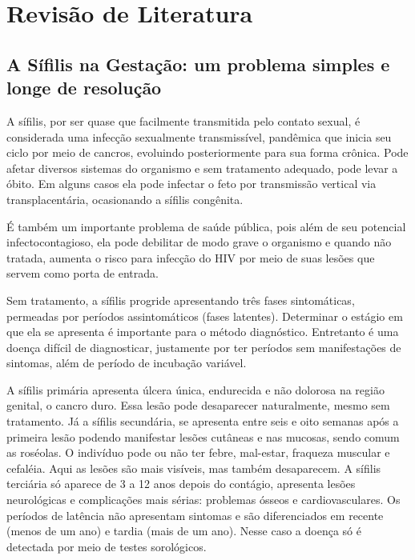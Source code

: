\chapter{Revisão de Literatura}
\label{sec:revisao}

\section{A Sífilis na Gestação: um problema simples e longe de resolução}
A sífilis, por ser quase que facilmente transmitida pelo contato sexual, é considerada uma infecção sexualmente transmissível, pandêmica que inicia seu ciclo por meio de cancros, evoluindo posteriormente para sua forma crônica. Pode afetar diversos sistemas do organismo e sem tratamento adequado, pode levar a óbito. Em alguns casos ela pode infectar o feto por transmissão vertical via transplacentária, ocasionando a sífilis congênita. \cite{silva2015feelings}

É também um importante problema de saúde pública, pois além de seu potencial infectocontagioso, ela pode debilitar de modo grave o organismo e quando não tratada, aumenta o risco para infecção do HIV por meio de suas lesões que servem como porta de entrada. \cite{manual2016sifilis}

Sem tratamento, a sífilis progride apresentando três fases sintomáticas, permeadas por períodos assintomáticos (fases latentes). Determinar o estágio em que ela se apresenta é importante para o método diagnóstico. Entretanto é uma doença difícil de diagnosticar, justamente por ter períodos sem manifestações de sintomas, além de período de incubação variável. \cite{manual2016sifilis}

A sífilis primária apresenta úlcera única, endurecida e não dolorosa  na região genital, o cancro duro. Essa lesão pode desaparecer naturalmente, mesmo sem tratamento. Já a sífilis secundária, se apresenta entre seis e oito semanas após a primeira lesão podendo manifestar lesões cutâneas e nas mucosas, sendo comum as roséolas. O indivíduo pode ou não ter febre, mal-estar, fraqueza muscular e cefaléia. Aqui as lesões são mais visíveis, mas também desaparecem. A sífilis terciária só aparece de 3 a 12 anos depois do contágio, apresenta lesões neurológicas e complicações mais sérias: problemas ósseos e cardiovasculares. Os períodos de latência não apresentam sintomas e são diferenciados em recente (menos de um ano) e tardia (mais de um ano). Nesse caso a doença só é detectada por meio de testes sorológicos. \cite{manual2016sifilis}

